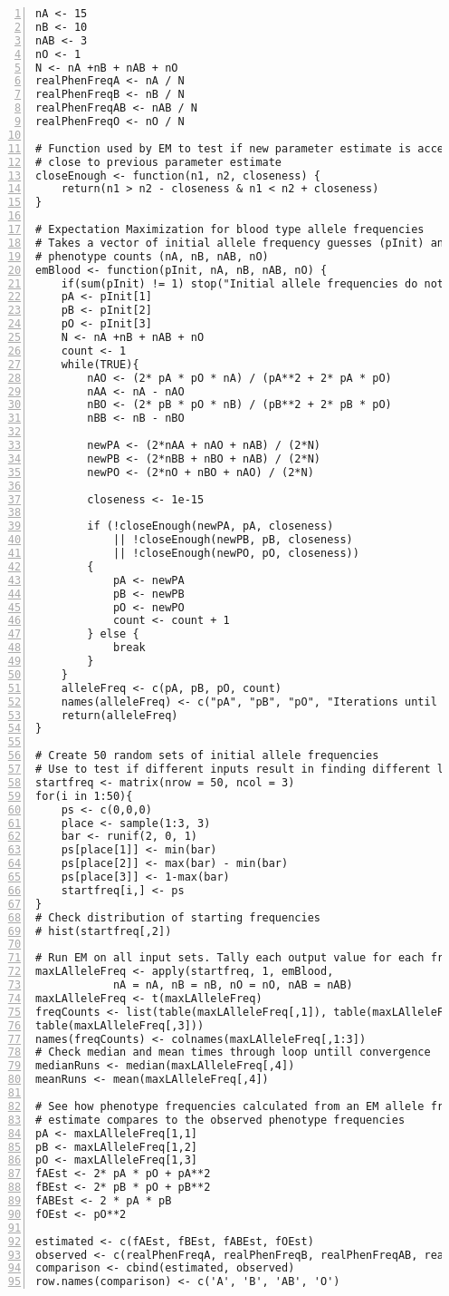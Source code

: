 \documentclass{article}
\begin{document}
		\begin{Verbatim}[numbers=left]
nA <- 15
nB <- 10
nAB <- 3
nO <- 1 
N <- nA +nB + nAB + nO
realPhenFreqA <- nA / N 
realPhenFreqB <- nB / N
realPhenFreqAB <- nAB / N
realPhenFreqO <- nO / N

# Function used by EM to test if new parameter estimate is acceptibly 
# close to previous parameter estimate
closeEnough <- function(n1, n2, closeness) {
	return(n1 > n2 - closeness & n1 < n2 + closeness)
}

# Expectation Maximization for blood type allele frequencies
# Takes a vector of initial allele frequency guesses (pInit) and observed
# phenotype counts (nA, nB, nAB, nO)
emBlood <- function(pInit, nA, nB, nAB, nO) {
	if(sum(pInit) != 1) stop("Initial allele frequencies do not sum to 1")
	pA <- pInit[1]
	pB <- pInit[2]
	pO <- pInit[3]
	N <- nA +nB + nAB + nO
	count <- 1
	while(TRUE){
		nAO <- (2* pA * pO * nA) / (pA**2 + 2* pA * pO)
		nAA <- nA - nAO
		nBO <- (2* pB * pO * nB) / (pB**2 + 2* pB * pO)
		nBB <- nB - nBO
		
		newPA <- (2*nAA + nAO + nAB) / (2*N)
		newPB <- (2*nBB + nBO + nAB) / (2*N)
		newPO <- (2*nO + nBO + nAO) / (2*N)
		
		closeness <- 1e-15
		
		if (!closeEnough(newPA, pA, closeness) 	
			|| !closeEnough(newPB, pB, closeness) 
			|| !closeEnough(newPO, pO, closeness)) 
		{
			pA <- newPA
			pB <- newPB
			pO <- newPO
			count <- count + 1
		} else {
			break
		}
	}
	alleleFreq <- c(pA, pB, pO, count)
	names(alleleFreq) <- c("pA", "pB", "pO", "Iterations until Convergence")
	return(alleleFreq)
}

# Create 50 random sets of initial allele frequencies
# Use to test if different inputs result in finding different local maxima
startfreq <- matrix(nrow = 50, ncol = 3)
for(i in 1:50){
	ps <- c(0,0,0)
	place <- sample(1:3, 3)
	bar <- runif(2, 0, 1)
	ps[place[1]] <- min(bar)
	ps[place[2]] <- max(bar) - min(bar)
	ps[place[3]] <- 1-max(bar)
	startfreq[i,] <- ps
}
# Check distribution of starting frequencies
# hist(startfreq[,2]) 

# Run EM on all input sets. Tally each output value for each frequency
maxLAlleleFreq <- apply(startfreq, 1, emBlood, 
			nA = nA, nB = nB, nO = nO, nAB = nAB)
maxLAlleleFreq <- t(maxLAlleleFreq)
freqCounts <- list(table(maxLAlleleFreq[,1]), table(maxLAlleleFreq[,2]), 
table(maxLAlleleFreq[,3]))
names(freqCounts) <- colnames(maxLAlleleFreq[,1:3])
# Check median and mean times through loop untill convergence
medianRuns <- median(maxLAlleleFreq[,4])
meanRuns <- mean(maxLAlleleFreq[,4])

# See how phenotype frequencies calculated from an EM allele frequency
# estimate compares to the observed phenotype frequencies
pA <- maxLAlleleFreq[1,1]
pB <- maxLAlleleFreq[1,2]
pO <- maxLAlleleFreq[1,3]
fAEst <- 2* pA * pO + pA**2
fBEst <- 2* pB * pO + pB**2
fABEst <- 2 * pA * pB
fOEst <- pO**2

estimated <- c(fAEst, fBEst, fABEst, fOEst)
observed <- c(realPhenFreqA, realPhenFreqB, realPhenFreqAB, realPhenFreqO)
comparison <- cbind(estimated, observed)
row.names(comparison) <- c('A', 'B', 'AB', 'O')
		\end{Verbatim}
	
\end{document}

